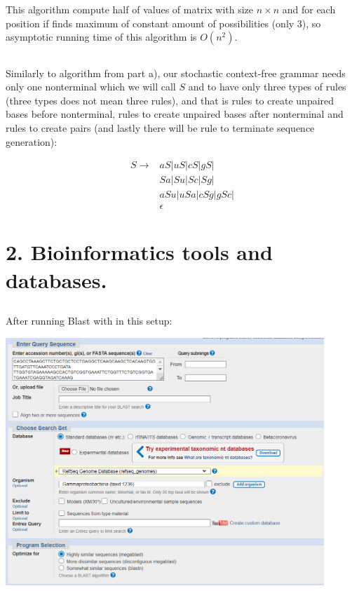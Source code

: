 \documentclass[a4paper]{article}
\begin{document}
	
	This algorithm compute half of values of matrix with size $n \times n$ and for each position if finds maximum of constant amount of possibilities (only 3), so asymptotic running time of this algorithm is $O(n^2)$.
	
	\subsection{}
	
	Similarly to algorithm from part a), our stochastic context-free grammar needs only one nonterminal which we will call $S$ and to have only three types of rules (three types does not mean three rules), and that is rules to create unpaired bases before nonterminal, rules to create unpaired bases after nonterminal and rules to create pairs (and lastly there will be rule to terminate sequence generation):
	
	\begin{align*}
		S \rightarrow & aS | uS | cS | gS |
		\\
		&Sa | Su | Sc | Sg | 
		\\
		&aSu | uSa | cSg | gSc | 
		\\
		&\epsilon 
	\end{align*}

	\subsection{}
	
	\section{2. Bioinformatics tools and databases.}
	
	\subsection{}
	
	After running Blast with in this setup:
	
	\centerline{\includegraphics[width=0.9\textwidth]{blast_set}}
	
\end{document}
